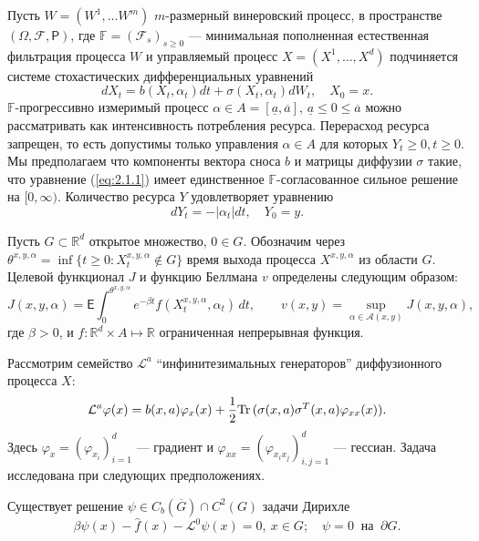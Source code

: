 Пусть $W=(W^1,\dots W^m)$ $m$-размерный винеровский процесс, в пространстве $(\Omega,\mathcal F,\mathsf P)$, где $\mathbb F=(\mathscr F_s)_{s\ge 0}$ --- минимальная пополненная естественная фильтрация процесса $W$ и управляемый процесс $X=(X^1,\dots,X^d)$ подчиняется системе стохастических дифференциальных уравнений
\begin{equation} \label{eq:2.1.1}
dX_t=b(X_t,\alpha_t) dt+\sigma(X_t,\alpha_t) dW_t, \quad X_0=x.
\end{equation}
$\mathbb F$-прогрессивно измеримый процесс $\alpha \in A=[\underline a, \overline a]$, $\underline a\le 0\le \overline a$ можно рассматривать как интенсивность потребления ресурса. Перерасход ресурса запрещен, то есть допустимы только управления $\alpha \in A$ для которых $Y_t \ge 0, t\ge 0$. Мы предполагаем что компоненты вектора сноса $b$ и матрицы диффузии $\sigma$ такие, что уравнение (\ref{eq:2.1.1}) имеет единственное $\mathbb F$-согласованное сильное решение на $[0,\infty)$.
Количество ресурса $Y$ удовлетворяет уравнению
\begin{equation} \label{eq:2.1.2}
dY_t=-|\alpha_t|dt,\quad Y_0=y.
\end{equation}


Пусть $G\subset \mathbb R^d$ открытое множество, $0\in G$. Обозначим через
$\theta^{x,y,\alpha}=\inf\{t\ge 0:X_t^{x,y,\alpha}\not \in G\}$ время выхода процесса $X^{x,y,\alpha}$ из области $G$.
Целевой функционал $J$ и функцию Беллмана $v$ определены следующим образом:
\begin{equation} \label{eq:2.1.3}
J(x,y,\alpha)=\mathsf E\int_0^{\theta^{x,y,\alpha}} e^{-\beta t} f(X_t^{x,y,\alpha},\alpha_t)\,dt, \qquad
v(x,y)=\sup_{\alpha\in\mathcal A(x,y)} J(x,y,\alpha),
\end{equation}
где $\beta>0$, и $f:\mathbb R^d\times A\mapsto\mathbb R$ ограниченная непрерывная функция.

Рассмотрим семейство $\mathcal L^a$ ``инфинитезимальных генераторов'' диффузионного процесса $X$:
$$ \mathcal L^a\varphi(x)=b(x,a)\varphi_x(x)+ \frac{1}{2}{\rm Tr\,}(\sigma(x,a)\sigma^T(x,a)\varphi_{xx}(x)).$$
Здесь $\varphi_x=(\varphi_{x_i})_{i=1}^d$ --- градиент и $\varphi_{xx}=(\varphi_{x_i x_j})_{i,j=1}^d$ --- гессиан. Задача исследована при следующих предположениях. 
\begin{assumption} \label{as:2.1}
Существует решение $\psi\in C_b(\overline G)\cap C^2(G)$ задачи Дирихле
\begin{equation} \label{eq:2.2.5}
\beta\psi(x)-\widehat f(x)-\mathcal L^0\psi (x)=0, \ x\in G; \quad \psi=0 \ \textrm{ на }\ \partial G.
\end{equation}
\end{assumption}


